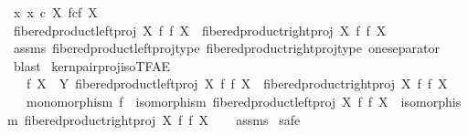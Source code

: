 \begin{isabellebody}
\ {\isachardoublequoteopen}{\isasymnexists}x{\isachardot}{\kern0pt}\ x\ {\isasymin}\isactrlsub c\ X\ \isactrlbsub f\isactrlesub {\isasymtimes}\isactrlsub c\isactrlbsub f\isactrlesub \ X{\isachardoublequoteclose}\isanewline
\ \ \isamarkupfalse%
\ \isamarkupfalse%
\ {\isachardoublequoteopen}fibered{\isacharunderscore}{\kern0pt}product{\isacharunderscore}{\kern0pt}left{\isacharunderscore}{\kern0pt}proj\ X\ f\ f\ X\ {\isacharequal}{\kern0pt}\ fibered{\isacharunderscore}{\kern0pt}product{\isacharunderscore}{\kern0pt}right{\isacharunderscore}{\kern0pt}proj\ X\ f\ f\ X{\isachardoublequoteclose}\isanewline
\ \ \ \ \isamarkupfalse%
\ assms\ fibered{\isacharunderscore}{\kern0pt}product{\isacharunderscore}{\kern0pt}left{\isacharunderscore}{\kern0pt}proj{\isacharunderscore}{\kern0pt}type\ fibered{\isacharunderscore}{\kern0pt}product{\isacharunderscore}{\kern0pt}right{\isacharunderscore}{\kern0pt}proj{\isacharunderscore}{\kern0pt}type\ one{\isacharunderscore}{\kern0pt}separator\ \isamarkupfalse%
\ blast\isanewline
{}\isamarkupfalse%
%
\endisatagproof
{\isafoldproof}%
%
\isadelimproof
\isanewline
%
\endisadelimproof
\isanewline
{}\isamarkupfalse%
\ kern{\isacharunderscore}{\kern0pt}pair{\isacharunderscore}{\kern0pt}proj{\isacharunderscore}{\kern0pt}iso{\isacharunderscore}{\kern0pt}TFAE{}{\isacharcolon}{\kern0pt}\isanewline
\ \ \ {\isachardoublequoteopen}f{\isacharcolon}{\kern0pt}\ X\ {\isasymrightarrow}\ Y{\isachardoublequoteclose}\ {\isachardoublequoteopen}fibered{\isacharunderscore}{\kern0pt}product{\isacharunderscore}{\kern0pt}left{\isacharunderscore}{\kern0pt}proj\ X\ f\ f\ X\ {\isacharequal}{\kern0pt}\ fibered{\isacharunderscore}{\kern0pt}product{\isacharunderscore}{\kern0pt}right{\isacharunderscore}{\kern0pt}proj\ X\ f\ f\ X{\isachardoublequoteclose}\isanewline
\ \ \ {\isachardoublequoteopen}monomorphism\ f\ {\isasymand}\ isomorphism\ {\isacharparenleft}{\kern0pt}fibered{\isacharunderscore}{\kern0pt}product{\isacharunderscore}{\kern0pt}left{\isacharunderscore}{\kern0pt}proj\ X\ f\ f\ X{\isacharparenright}{\kern0pt}\ {\isasymand}\ isomorphism\ {\isacharparenleft}{\kern0pt}fibered{\isacharunderscore}{\kern0pt}product{\isacharunderscore}{\kern0pt}right{\isacharunderscore}{\kern0pt}proj\ X\ f\ f\ X{\isacharparenright}{\kern0pt}{\isachardoublequoteclose}\isanewline
%
\isadelimproof
\ \ %
\endisadelimproof
%
\isatagproof
{}\isamarkupfalse%
\ assms\isanewline
{}\isamarkupfalse%
\ safe\isanewline

\end{isabellebody}
